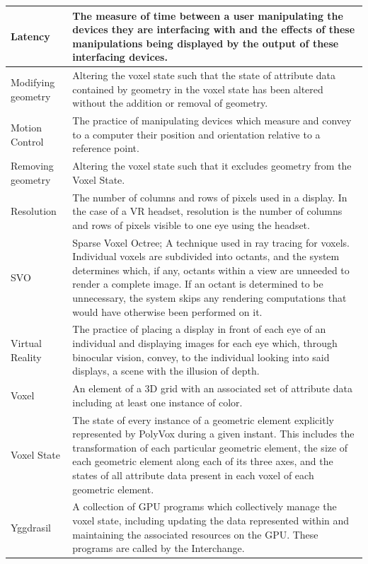 \documentclass[onecolumn, draftclsnofoot,10pt, compsoc]{IEEEtran}
\begin{document}
\begin{longtable}{ | l | p{12cm} | }
Latency & The measure of time between a user manipulating the devices they are interfacing with and the effects of these manipulations being displayed by the output of these interfacing devices. \\ \hline
Modifying geometry & Altering the voxel state such that the state of attribute data contained by geometry in the voxel state has been altered without the addition or removal of geometry.  \\ \hline
Motion Control & The practice of manipulating devices which measure and convey to a computer their position and orientation relative to a reference point.  \\ \hline
Removing geometry & Altering the voxel state such that it excludes geometry from the Voxel State.  \\ \hline
Resolution & The number of columns and rows of pixels used in a display. In the case of  a VR headset, resolution is the number of columns and rows of pixels visible to one eye using the headset. \\ \hline
SVO & Sparse Voxel Octree; A technique used in ray tracing for voxels. Individual voxels are subdivided into octants, and the system determines which, if any, octants within a view are unneeded to render a complete image. If an octant is determined to be unnecessary, the system skips any rendering computations that would have otherwise been performed on it.\\ \hline
Virtual Reality & The practice of placing a display in front of each eye of an individual and displaying images for each eye which, through binocular vision, convey, to the individual looking into said displays, a scene with the illusion of depth.  \\ \hline
Voxel & An element of a 3D grid with an associated set of attribute data including at least one instance of color.  \\ \hline
Voxel State & The state of every instance of a geometric element explicitly represented by PolyVox during a given instant. This includes the transformation of each particular geometric element, the size of each geometric element along each of its three axes, and the states of all attribute data present in each voxel of each geometric element. \\ \hline
Yggdrasil & A collection of GPU programs which collectively manage the voxel state, including updating the data represented within and maintaining the associated resources on the GPU. These programs are called by the Interchange. \\ \hline
\end{longtable}
\end{document}
